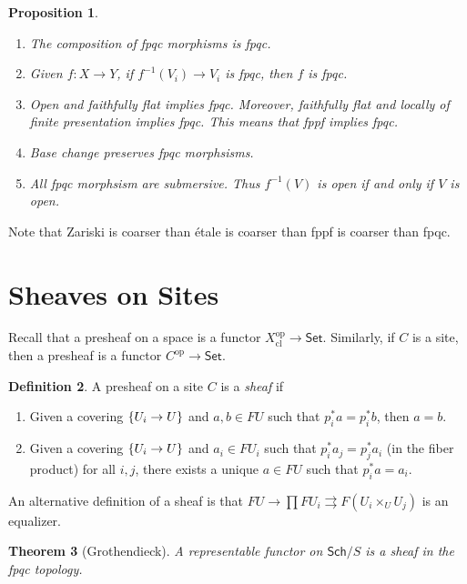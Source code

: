 \documentclass[leqno, openany]{memoir}
\newtheorem{thm}{Theorem}[section]
\newtheorem{prop}[thm]{Proposition}
\theoremstyle{definition}
\newtheorem{defn}[thm]{Definition}
\theoremstyle{remark}
\theoremstyle{plain}
\theoremstyle{definition}
\theoremstyle{remark}
\newcommand{\mr}[1]{\mathrm{#1}}
\newcommand{\ms}[1]{\mathsf{#1}}
\begin{document}
\begin{prop} \begin{enumerate} \item The composition of fpqc morphisms is fpqc.
    \item Given $f \colon X \to Y$, if $f^{-1}(V_i) \to V_i$ is fpqc, then $f$
        is fpqc.  \item Open and faithfully flat implies fpqc. Moreover,
        faithfully flat and locally of finite presentation implies fpqc. This
        means that fppf implies fpqc.  \item Base change preserves fpqc
morphsisms.  \item All fpqc morphsism are submersive. Thus $f^{-1}(V)$ is open
if and only if $V$ is open.  \end{enumerate} \end{prop}

Note that Zariski is coarser than \'etale is coarser than fppf is coarser than
fpqc.

\section{Sheaves on Sites}%

Recall that a presheaf on a space is a functor $X_{\mr{cl}}^{\mr{op}} \to
\ms{Set}$. Similarly, if $C$ is a site, then a presheaf is a functor
$C^{\mr{op}} \to \ms{Set}$.

\begin{defn} A presheaf on a site $C$ is a \textit{sheaf} if \begin{enumerate}
    \item Given a covering $\qty{U_i \to U}$ and $a,b \in FU$ such that $p_i^*a
        = p_i^*b$, then $a = b$.  \item Given a covering $\qty{U_i \to U}$ and
        $a_i \in FU_i$ such that $p_i^* a_j = p_j^* a_i$ (in the fiber product)
        for all $i,j$, there exists a unique $a \in FU$ such that $p_i^* a =
        a_i$.  \end{enumerate} \end{defn}

An alternative definition of a sheaf is that $FU \to \prod F U_i
\rightrightarrows F(U_i \times_U U_j)$ is an equalizer.

\begin{thm}[Grothendieck] A representable functor on $\ms{Sch}/S$ is a sheaf in
the fpqc topology.  \end{thm}
\end{document}
